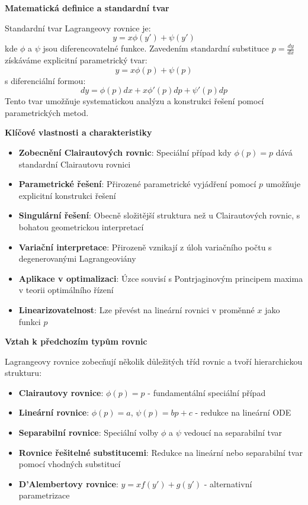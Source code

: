 \vspace{1\baselineskip}

\noindent\textbf{Matematická definice a standardní tvar}

Standardní tvar Lagrangeovy rovnice je:
\[
y = x\phi(y') + \psi(y')
\]
kde $\phi$ a $\psi$ jsou diferencovatelné funkce. Zavedením standardní substituce $p = \frac{dy}{dx}$ získáváme explicitní parametrický tvar:
\[
y = x\phi(p) + \psi(p)
\]
s diferenciální formou:
\[
dy = \phi(p)dx + x\phi'(p)dp + \psi'(p)dp
\]
Tento tvar umožňuje systematickou analýzu a konstrukci řešení pomocí parametrických metod.

\vspace{1\baselineskip}

\noindent\textbf{Klíčové vlastnosti a charakteristiky}

\begin{itemize}
\item \textbf{Zobecnění Clairautových rovnic}: Speciální případ kdy $\phi(p) = p$ dává standardní Clairautovu rovnici
\item \textbf{Parametrické řešení}: Přirozené parametrické vyjádření pomocí $p$ umožňuje explicitní konstrukci řešení
\item \textbf{Singulární řešení}: Obecně složitější struktura než u Clairautových rovnic, s bohatou geometrickou interpretací
\item \textbf{Variační interpretace}: Přirozeně vznikají z úloh variačního počtu s degenerovanými Lagrangeoviány
\item \textbf{Aplikace v optimalizaci}: Úzce souvisí s Pontrjaginovým principem maxima v teorii optimálního řízení
\item \textbf{Linearizovatelnost}: Lze převést na lineární rovnici v proměnné $x$ jako funkci $p$
\end{itemize}

\vspace{1\baselineskip}

\noindent\textbf{Vztah k předchozím typům rovnic}

Lagrangeovy rovnice zobecňují několik důležitých tříd rovnic a tvoří hierarchickou strukturu:

\begin{itemize}
\item \textbf{Clairautovy rovnice}: $\phi(p) = p$ - fundamentální speciální případ
\item \textbf{Lineární rovnice}: $\phi(p) = a$, $\psi(p) = bp + c$ - redukce na lineární ODE
\item \textbf{Separabilní rovnice}: Speciální volby $\phi$ a $\psi$ vedoucí na separabilní tvar
\item \textbf{Rovnice řešitelné substitucemi}: Redukce na lineární nebo separabilní tvar pomocí vhodných substitucí
\item \textbf{D'Alembertovy rovnice}: $y = xf(y') + g(y')$ - alternativní parametrizace
\end{itemize}

